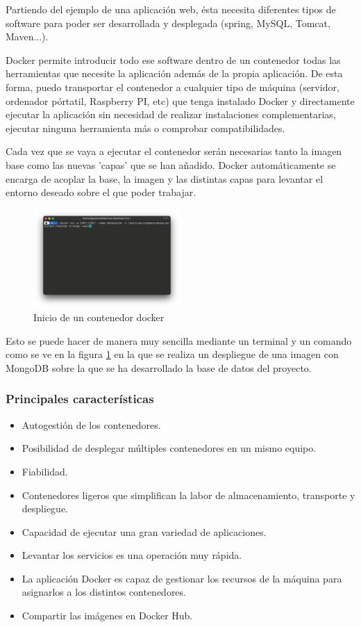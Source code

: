 Partiendo del ejemplo de una aplicación web, ésta necesita diferentes tipos de software para poder ser desarrollada y desplegada (spring, MySQL, Tomcat, Maven...). 

Docker permite introducir todo ese software dentro de un contenedor todas las herramientas que necesite la aplicación además de la propia aplicación. De esta forma, puedo transportar el contenedor a cualquier tipo de máquina (servidor, ordenador pórtatil, Raspberry PI, etc) que tenga instalado Docker y directamente ejecutar la aplicación sin necesidad de realizar instalaciones complementarias, ejecutar ninguna herramienta más o comprobar compatibilidades.

Cada vez que se vaya a ejecutar el contenedor serán necesarias tanto la imagen base como las nuevas 'capas' que se han añadido. Docker automáticamente se encarga de acoplar la base, la imagen y las distintas capas para levantar el entorno deseado sobre el que poder trabajar. 

\begin{figure}[H]
    \centering
    \includegraphics[width=0.5\textwidth]{include/capturas/dockerRun.png}
    \caption{Inicio de un contenedor docker}
    \label{fig:docker_run}
\end{figure}

Esto se puede hacer de manera muy sencilla mediante un terminal \cite{basicDocker} y un comando como se ve en la figura \ref{fig:docker_run} en la que se realiza un despliegue de una imagen con MongoDB sobre la que se ha desarrollado la base de datos del proyecto.

\subsubsection{Principales características}
\begin{itemize}
    \item Autogestión de los contenedores.
    \item Posibilidad de desplegar múltiples contenedores en un mismo equipo.
    \item Fiabilidad.
    \item Contenedores ligeros que simplifican la labor de almacenamiento, transporte y despliegue.
    \item Capacidad de ejecutar una gran variedad de aplicaciones.
    \item Levantar los servicios es una operación muy rápida.
    \item La aplicación Docker es capaz de gestionar los recursos de la máquina para asignarlos a los distintos contenedores.
    \item Compartir las imágenes en Docker Hub.
\end{itemize}

